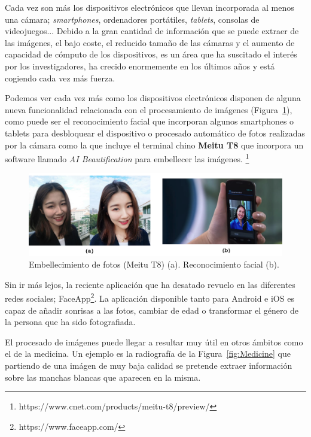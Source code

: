 Cada vez son más los dispositivos electrónicos que llevan incorporada al menos una cámara; \textit{smartphones}, ordenadores portátiles, \textit{tablets}, consolas de videojuegos... Debido a la gran cantidad de información que se puede extraer de las imágenes, el bajo coste, el reducido tamaño de las cámaras y el aumento de capacidad de cómputo de los dispositivos, es un área que ha suscitado el interés por los investigadores, ha crecido enormemente en los últimos años y está cogiendo cada vez más fuerza.

Podemos ver cada vez más como los dispositivos electrónicos disponen de alguna nueva funcionalidad relacionada con el procesamiento de imágenes (Figura~\ref{fig:Face}), como puede ser el reconocimiento facial que incorporan algunos smartphones o tablets para desbloquear el dispositivo o procesado automático de fotos realizadas por la cámara como la que incluye el terminal chino \textbf{Meitu T8} que incorpora un software llamado \textit{AI Beautification} para embellecer las imágenes. \footnote{https://www.cnet.com/products/meitu-t8/preview/}

\begin{figure}[th]
\centering
\includegraphics[scale=0.43]{Figures/face.png}
\decoRule
\caption[Embellecimiento de fotos (Meitu T8)]{Embellecimiento de fotos (Meitu T8) (a). Reconocimiento facial (b).}
\label{fig:Face}
\end{figure}

Sin ir más lejos, la reciente aplicación que ha desatado revuelo en las diferentes redes sociales; FaceApp\footnote{https://www.faceapp.com/}. La aplicación disponible tanto para Android e iOS es capaz de añadir sonrisas a las fotos, cambiar de edad o transformar el género de la persona que ha sido fotografiada.

El procesado de imágenes puede llegar a resultar muy útil en otros ámbitos como el de la medicina. Un ejemplo es la radiografía de la Figura~\ref{fig:Medicine} que partiendo de una imágen de muy baja calidad se  pretende  extraer  información  sobre  las  manchas
blancas que aparecen en la misma.

